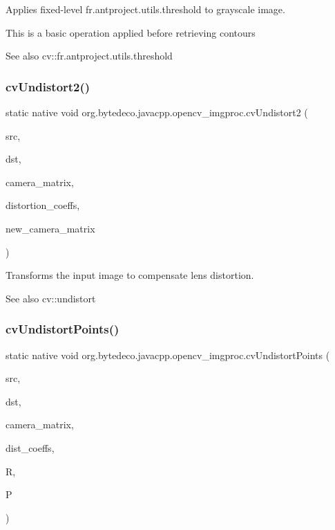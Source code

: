 Applies fixed-\/level fr.antproject.utils.threshold to grayscale image.

This is a basic operation applied before retrieving contours \begin{DoxySeeAlso}{See also}
cv\+::fr.antproject.utils.threshold
\end{DoxySeeAlso}
\mbox{\label{group__imgproc__c_ga2b891154762834fb030334ea95ebdce9}} 
\subsubsection{\texorpdfstring{cv\+Undistort2()}{cvUndistort2()}}
{\footnotesize\ttfamily static native void org.\+bytedeco.\+javacpp.\+opencv\+\_\+imgproc.\+cv\+Undistort2 (\begin{DoxyParamCaption}\item[{@Const Cv\+Arr}]{src,  }\item[{Cv\+Arr}]{dst,  }\item[{@Const Cv\+Mat}]{camera\+\_\+matrix,  }\item[{@Const Cv\+Mat}]{distortion\+\_\+coeffs,  }\item[{@Const Cv\+Mat}]{new\+\_\+camera\+\_\+matrix }\end{DoxyParamCaption})\hspace{0.3cm}{\ttfamily [static]}}



Transforms the input image to compensate lens distortion. 

\begin{DoxySeeAlso}{See also}
cv\+::undistort 
\end{DoxySeeAlso}
\mbox{\label{group__imgproc__c_ga21444b957a9e68dffef016a844ff35a1}} 
\subsubsection{\texorpdfstring{cv\+Undistort\+Points()}{cvUndistortPoints()}}
{\footnotesize\ttfamily static native void org.\+bytedeco.\+javacpp.\+opencv\+\_\+imgproc.\+cv\+Undistort\+Points (\begin{DoxyParamCaption}\item[{@Const Cv\+Mat}]{src,  }\item[{Cv\+Mat}]{dst,  }\item[{@Const Cv\+Mat}]{camera\+\_\+matrix,  }\item[{@Const Cv\+Mat}]{dist\+\_\+coeffs,  }\item[{@Const Cv\+Mat}]{R,  }\item[{@Const Cv\+Mat}]{P }\end{DoxyParamCaption})\hspace{0.3cm}{\ttfamily [static]}}



